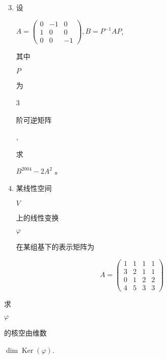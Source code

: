 \documentclass[10pt]{article}
\begin{document}
\begin{enumerate}
  \setcounter{enumi}{2}
  \item \begin{CJK}{UTF8}{mj}设\end{CJK} $A=\left(\begin{array}{ccc}0 & -1 & 0 \\ 1 & 0 & 0 \\ 0 & 0 & -1\end{array}\right), B=P^{-1} A P$, \begin{CJK}{UTF8}{mj}其中\end{CJK} $P$ \begin{CJK}{UTF8}{mj}为\end{CJK} 3 \begin{CJK}{UTF8}{mj}阶可逆矩阵\end{CJK}, \begin{CJK}{UTF8}{mj}求\end{CJK} $B^{2004}-2 A^{2}$ 。

  \item \begin{CJK}{UTF8}{mj}某线性空间\end{CJK} $V$ \begin{CJK}{UTF8}{mj}上的线性变换\end{CJK} $\varphi$ \begin{CJK}{UTF8}{mj}在某组基下的表示矩阵为\end{CJK}

\end{enumerate}
$$
A=\left(\begin{array}{llll}
1 & 1 & 1 & 1 \\
3 & 2 & 1 & 1 \\
0 & 1 & 2 & 2 \\
4 & 5 & 3 & 3
\end{array}\right)
$$
\begin{CJK}{UTF8}{mj}求\end{CJK} $\varphi$ \begin{CJK}{UTF8}{mj}的核空由维数\end{CJK} $\operatorname{dim} \operatorname{Ker}(\varphi)$.
\end{document}
